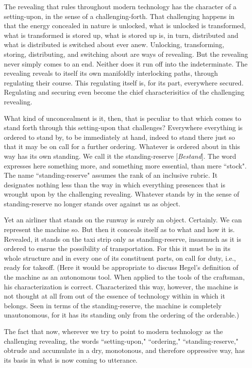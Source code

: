 The revealing that rules throughout modern technology has the character of a setting-upon, in the sense of a challenging-forth. That challenging happens in that the energy concealed in nature is unlocked, what is unlocked is transformed, what is transformed is stored up, what is stored up is, in turn, distributed and what is distributed is switched about ever anew. Unlocking, transforming, storing, distributing, and switching about are ways of revealing. But the revealing never simply comes to an end. Neither does it run off into the indeterminate. The revealing reveals to itself its own manifoldly interlocking paths, through regulating their course. This regulating itself is, for its part, everywhere secured. Regulating and securing even become the chief characterisitics of the challenging revealing.

What kind of unconcealment is it, then, that is peculiar to that which comes to stand forth through this setting-upon that challenges? Everywhere everything is ordered to stand by, to be immediately at hand, indeed to stand there just so that it may be on call for a further ordering. Whatever is ordered about in this way has its own standing. We call it the standing-reserve [\textit{Bestand}]. The word expresses here something more, and something more essential, than mere ``stock". The name ``standing-reserve" assumes the rank of an inclusive rubric. It designates nothing less than the way in which everything presences that is wrought upon by the challenging revealing. Whatever stands by in the sense of standing-reserve no longer stands over against us as object.

Yet an airliner that stands on the runway is surely an object. Certainly. We can represent the machine so. But then it conceals itself as to what and how it is. Revealed, it stands on the taxi strip only as standing-reserve, insasmuch as it is ordered to ensrue the possibility of transportation. For this it must be in its whole structure and in every one of its constituent parts, on call for duty, i.e., ready for takeoff. (Here it would be appropriate to discuss Hegel's definition of the machine as an autonomous tool. When applied to the tools of the craftsman, his characterization is correct. Characterized this way, however, the machine is not thought at all from out of the essence of technology within in which it belongs. Seen in terms of the standing-reserve, the machine is completely unautonomous, for it has its standing only from the ordering of the orderable.)

The fact that now, wherever we try to point to modern technology as the challenging revealing, the words ``setting-upon," ``ordering," ``standing-reserve," obtrude and accumulate in a dry, monotonous, and therefore oppressive way, has its basis in what is now coming to utterance.

